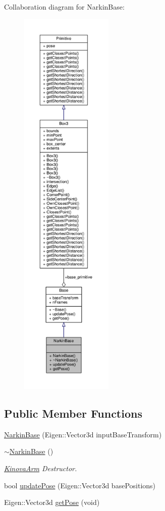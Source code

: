 Collaboration diagram for Narkin\+Base\+:
\nopagebreak
\begin{figure}[H]
\begin{center}
\leavevmode
\includegraphics[height=550pt]{class_narkin_base__coll__graph}
\end{center}
\end{figure}
\subsection*{Public Member Functions}
\begin{DoxyCompactItemize}
\item 
\hyperlink{class_narkin_base_a35e4edf9bb144fd8dee636e41d9ae9e9}{Narkin\+Base} (Eigen\+::\+Vector3d input\+Base\+Transform)
\item 
\hyperlink{class_narkin_base_ad42db1b25986d226e5667579568d1705}{$\sim$\+Narkin\+Base} ()
\begin{DoxyCompactList}\small\item\em \hyperlink{class_kinova_arm}{Kinova\+Arm} Destructor. \end{DoxyCompactList}\item 
bool \hyperlink{class_narkin_base_abb56af256ebb5c152d0a5c4c3904c66e}{update\+Pose} (Eigen\+::\+Vector3d base\+Positions)
\item 
Eigen\+::\+Vector3d \hyperlink{class_narkin_base_a8a9784395d2070c5276dbf80def713e4}{get\+Pose} (void)
\end{DoxyCompactItemize}
